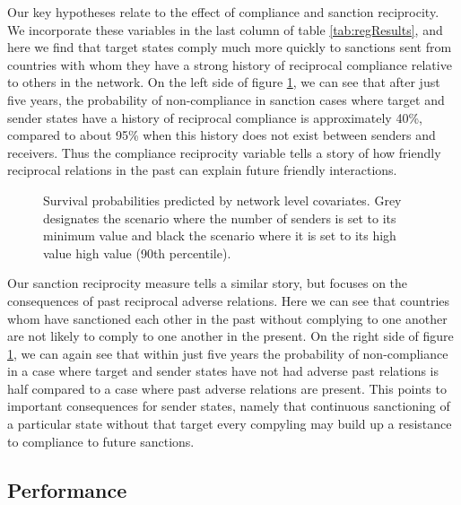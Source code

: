 Our key hypotheses relate to the effect of compliance and sanction reciprocity. We incorporate these variables in the last column of table \ref{tab:regResults}, and here we find that target states comply much more quickly to sanctions sent from countries with whom they have a strong history of reciprocal compliance relative to others in the network. On the left side of figure \ref{fig:surv3}, we can see that after just five years, the probability of non-compliance in sanction cases where target and sender states have a history of reciprocal compliance is approximately 40\%, compared to about 95\% when this history does not exist between senders and receivers. Thus the compliance reciprocity variable tells a story of how friendly reciprocal relations in the past can explain future friendly interactions. 

\begin{figure}[ht]
	\centering
	\caption{Survival probabilities predicted by network level covariates. Grey designates the scenario where the number of senders is set to its minimum value and black the scenario where it is set to its high value high value (90th percentile).}
	\resizebox{1\textwidth}{!}{}	
	\label{fig:surv3}	
\end{figure}
\FloatBarrier

Our sanction reciprocity measure tells a similar story, but focuses on the consequences of past reciprocal adverse relations. Here we can see that countries whom have sanctioned each other in the past without complying to one another are not likely to comply to one another in the present. On the right side of figure \ref{fig:surv3}, we can again see that within just five years the probability of non-compliance in a case where target and sender states have not had adverse past relations is half compared to a case where past adverse relations are present. This points to important consequences for sender states, namely that continuous sanctioning of a particular state without that target every compyling  may build up a resistance to compliance to future sanctions. 

\subsection*{Performance}

